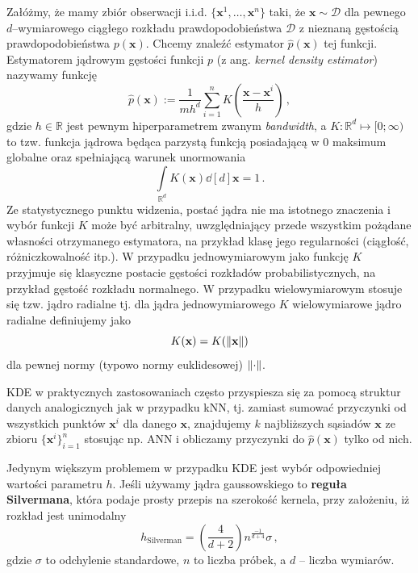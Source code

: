 \documentclass{myclass}
\numberwithin{equation}{section}
\begin{document}
Załóżmy, że mamy zbiór obserwacji i.i.d. \(\{\mathbf{x}^1, \ldots, \mathbf{x}^n\}\) taki, że
\(\mathbf{x} \sim \mathcal{D}\) dla pewnego \(d\)--wymiarowego ciągłego rozkładu
prawdopodobieństwa \(\mathcal{D}\) z nieznaną gęstością prawdopodobieństwa \(p(\mathbf{x})\). Chcemy
znaleźć estymator \(\hat{p}(\mathbf{x})\) tej funkcji. Estymatorem jądrowym gęstości funkcji \(p\)
(z ang. \textit{kernel density estimator}) nazywamy funkcję
\begin{equation}\boxed{
    \hat{p}(\mathbf{x}) := \frac{1}{mh^d}\sum_{i=1}^n K\left(\frac{\mathbf{x} - \mathbf{x}^i}{h}\right)\,,
}\end{equation}
gdzie \(h \in \mathbb{R}\) jest pewnym hiperparametrem zwanym \textit{bandwidth}, a \(K:
\mathbb{R}^d \mapsto [0; \infty)\) to tzw. funkcja jądrowa będąca parzystą funkcją posiadającą w 0
maksimum globalne oraz spełniającą warunek unormowania
\begin{equation}
    \int\limits_{\mathbb{R}^d} K(\mathbf{x}) \dd[d]{\mathbf{x}}= 1\,.
\end{equation}
Ze statystycznego punktu widzenia, postać jądra nie ma istotnego znaczenia i wybór funkcji  \(K\)
może być arbitralny, uwzględniający przede wszystkim pożądane własności otrzymanego estymatora, na
przykład klasę jego regularności (ciągłość, różniczkowalność itp.). W przypadku jednowymiarowym jako
funkcję \(K\) przyjmuje się klasyczne postacie gęstości rozkładów probabilistycznych, na przykład
gęstość rozkładu normalnego. W przypadku wielowymiarowym stosuje się tzw. jądro radialne tj. dla
jądra jednowymiarowego \(K\) wielowymiarowe jądro radialne definiujemy jako
\begin{equation}
    K(\mathbf{x}) = K(\norm{\mathbf{x}})
\end{equation}
dla pewnej normy (typowo normy euklidesowej) \(\norm{\cdot}\).

KDE w praktycznych zastosowaniach często przyspiesza się za pomocą struktur danych analogicznych jak
w przypadku kNN, tj. zamiast sumować przyczynki od wszystkich punktów \(\mathbf{x}^i\) dla danego
\(\mathbf{x}\), znajdujemy \(k\) najbliższych sąsiadów \(\mathbf{x}\) ze zbioru
\(\{\mathbf{x}^i\}_{i=1}^n\) stosując np. ANN i obliczamy przyczynki do \(\hat{p}(\mathbf{x})\)
tylko od nich.

Jedynym większym problemem w przypadku KDE jest wybór odpowiedniej wartości parametru \(h\). Jeśli
używamy jądra gaussowskiego to \textbf{reguła Silvermana}, która podaje prosty przepis na szerokość
kernela, przy założeniu, iż rozkład jest unimodalny
\begin{equation}
    h_\mathrm{Silverman} = \left(\frac{4}{d + 2}\right)n^{\frac{-1}{d + 4}}\sigma\,,
\end{equation}
gdzie \(\sigma\) to odchylenie standardowe, \(n\) to liczba próbek, a \(d\) -- liczba wymiarów.
\end{document}
